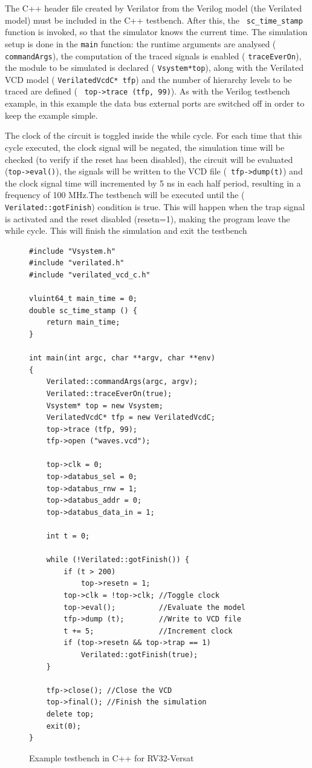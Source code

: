 \documentclass[conference]{IEEEtran}
\begin{document}
The C++ header file created by Verilator from the Verilog model (the Verilated
model) must be included in the C++ testbench. After this, the {\tt
	sc\_time\_stamp} function is invoked, so that the simulator knows the current
time. The simulation setup is done in the {\tt main} function: the runtime
arguments are analysed ( {\tt commandArgs}), the computation of the traced
signals is enabled ( {\tt traceEverOn}), the module to be simulated is declared
( {\tt Vsystem*top}), along with the Verilated VCD model ( {\tt VerilatedVcdC*
	tfp}) and the number of hierarchy levels to be traced are defined ( {\tt
	top->trace (tfp, 99)}). As with the Verilog testbench example, in this example
the data bus external ports are switched off in order to keep the example
simple.

The clock of the circuit is toggled inside the while cycle. For each time that
this cycle executed, the clock signal will be negated, the simulation time will
be checked (to verify if the reset has been disabled), the circuit will be
evaluated ({\tt top->eval()}), the signals will be written to the VCD file ({\tt
	tfp->dump(t)}) and the clock signal time will incremented by 5 ns in each half
period, resulting in a frequency of 100 MHz.The testbench will be executed until
the ( {\tt Verilated::gotFinish}) condition is true. This will happen when the
trap signal is activated and the reset disabled (resetn=1), making the program
leave the while cycle. This will finish the simulation and exit the testbench

\lstset{language=C++}
\lstset{basicstyle=\scriptsize}
\begin{figure}[!htb]
\begin{minipage}{\linewidth}
\begin{lstlisting}[frame=single]
#include "Vsystem.h"
#include "verilated.h"
#include "verilated_vcd_c.h"

vluint64_t main_time = 0; 
double sc_time_stamp () {
	return main_time;
}

int main(int argc, char **argv, char **env)
{
	Verilated::commandArgs(argc, argv);
	Verilated::traceEverOn(true);
	Vsystem* top = new Vsystem;
	VerilatedVcdC* tfp = new VerilatedVcdC;
	top->trace (tfp, 99);
	tfp->open ("waves.vcd");
	
	top->clk = 0;
	top->databus_sel = 0;
	top->databus_rnw = 1;
	top->databus_addr = 0;
	top->databus_data_in = 1;
	
	int t = 0;
	
	while (!Verilated::gotFinish()) {
		if (t > 200)
			top->resetn = 1;
		top->clk = !top->clk; //Toggle clock
		top->eval();          //Evaluate the model
		tfp->dump (t);        //Write to VCD file
		t += 5;               //Increment clock
		if (top->resetn && top->trap == 1)
			Verilated::gotFinish(true);
	}

	tfp->close(); //Close the VCD
	top->final(); //Finish the simulation
	delete top;
	exit(0);
}
\end{lstlisting}
\end{minipage}

	\caption{Example testbench in C++ for RV32-Versat}
	\label{fig:tb_cpp}
\end{figure}
\lstset{basicstyle=\normalsize}
\end{document}
